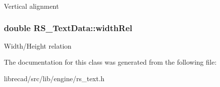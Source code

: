 Vertical alignment \hypertarget{classRS__TextData_a9441dd6298da8738c3d9de5e8ebfa650}{
\subsubsection[{width\-Rel}]{\setlength{\rightskip}{0pt plus 5cm}double R\-S\-\_\-\-Text\-Data\-::width\-Rel}}\label{classRS__TextData_a9441dd6298da8738c3d9de5e8ebfa650}
Width/\-Height relation 

The documentation for this class was generated from the following file\-:\begin{DoxyCompactItemize}
\item 
librecad/src/lib/engine/rs\-\_\-text.\-h\end{DoxyCompactItemize}
